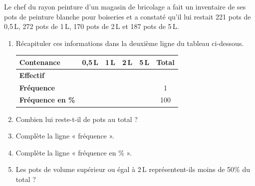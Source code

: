 \documentclass[a4paper]{book}
\begin{document}
    \begin{exercice}
        Le chef du rayon peinture d'un magasin de bricolage a fait un inventaire de ses pots de peinture blanche pour boiseries et a constaté qu'il lui restait 221 pots de 0,5\,L, 272 pots de 1\,L, 170 pots de 2\,L et 187 pots de 5\,L.
        
        \begin{enumerate}
            \item Récapituler ces informations dans la deuxième ligne du tableau ci-dessous.
            
            \begin{center}
                \begin{tabular}{l|c|c|c|c|c}
                    \toprule
                    \textbf{Contenance} & \textbf{0,5\,L} & \textbf{1\,L} & \textbf{2\,L} & \textbf{5\,L} & \textbf{Total} \\
                    \midrule
                    \textbf{Effectif} & & & & & \\
                    \midrule
                    \textbf{Fréquence} & & & & & 1 \\
                    \textbf{Fréquence en \%} & & & & & 100 \\
                    \bottomrule
                \end{tabular}
            \end{center}
            
            \item Combien lui reste-t-il de pots au total ?
            
            \item Complète la ligne « fréquence ».
            
            \item Complète la ligne « fréquence en \% ».
            
            \item Les pots de volume supérieur ou égal à 2\,L représentent-ils moins de 50\% du total ?
        \end{enumerate}
    \end{exercice}


\setcounter{exo}{1}
\end{document}

